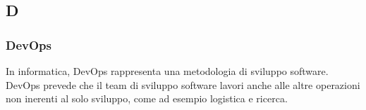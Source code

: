 \subsection*{D}
    \subsubsection*{DevOps}

        In informatica, DevOps rappresenta una metodologia di sviluppo software.
        DevOps prevede che il team di sviluppo software lavori anche alle altre operazioni non inerenti al solo
        sviluppo, come ad esempio logistica e ricerca.